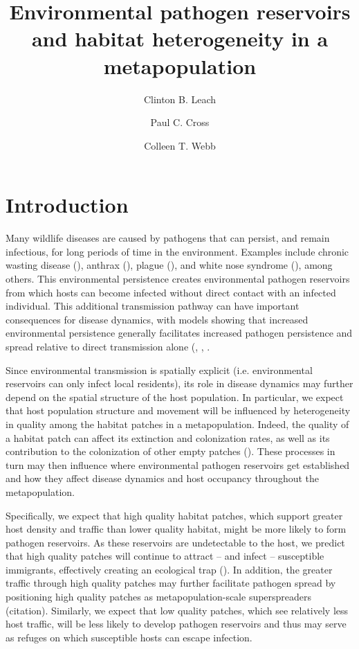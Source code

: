 \documentclass{svjour3}
\begin{document}
\title{Environmental pathogen reservoirs and habitat heterogeneity in a metapopulation}

\author{Clinton B. Leach \and Paul C. Cross \and Colleen T. Webb}




\maketitle

\section{Introduction}
\label{intro}

Many wildlife diseases are caused by pathogens that can persist, and remain infectious, for long periods of time in the environment.  Examples include chronic wasting disease (\cite{Miller2006}), anthrax (\cite{Dragon1995}), plague (\cite{Eisen2008}), and white nose syndrome (\cite{Lindner2011}), among others.  This environmental persistence creates environmental pathogen reservoirs from which hosts can become infected without direct contact with an infected individual.  This additional transmission pathway can have important consequences for disease dynamics, with models showing that increased environmental persistence generally facilitates increased pathogen persistence and spread relative to direct transmission alone (\cite{Almberg2011}, \cite{Sharp2011}, \cite{Breban2009}. 

Since environmental transmission is spatially explicit (i.e. environmental reservoirs can only infect local residents), its role in disease dynamics may further depend on the spatial structure of the host population.  In particular, we expect that host population structure and movement will be influenced by heterogeneity in quality among the habitat patches in a metapopulation.  Indeed, the quality of a habitat patch can affect its extinction and colonization rates, as well as its contribution to the colonization of other empty patches (\cite{Moilanen1998}).  These processes in turn may then influence where environmental pathogen reservoirs get established and how they affect disease dynamics and host occupancy throughout the metapopulation.  

Specifically, we expect that high quality habitat patches, which support greater host density and traffic than lower quality habitat, might be more likely to form pathogen reservoirs.  As these reservoirs are undetectable to the host, we predict that high quality patches will continue to attract -- and infect -- susceptible immigrants, effectively creating an ecological trap (\cite{Almberg2011}).  In addition, the greater traffic through high quality patches may further facilitate pathogen spread by positioning high quality patches as metapopulation-scale superspreaders (citation).  Similarly, we expect that low quality patches, which see relatively less host traffic, will be less likely to develop pathogen reservoirs and thus may serve as refuges on which susceptible hosts can escape infection.  
\end{document}
